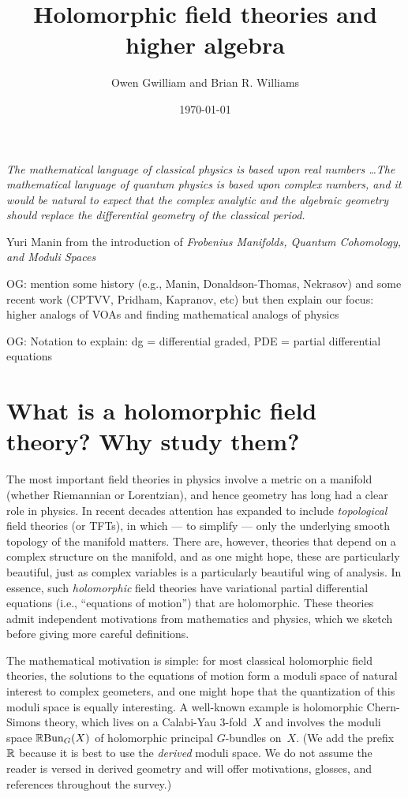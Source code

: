 \documentclass[11pt]{amsart}
\author{Owen Gwilliam and Brian R. Williams}
\date{\today}
\title{Holomorphic field theories and higher algebra}
\def\owen#1{{\textcolor{violet!50!black}{OG: {#1}}}}
\begin{document}

\maketitle

\epigraph{\itshape The mathematical language of classical physics is based upon real numbers \dots The mathematical language of quantum physics is based upon complex numbers, and it would be natural to expect that the complex analytic and the algebraic geometry should replace the differential geometry of the classical period.}{Yuri Manin from the introduction of {\it Frobenius Manifolds, Quantum Cohomology, and Moduli Spaces}}

\tableofcontents

\owen{mention some history (e.g., Manin, Donaldson-Thomas, Nekrasov) and some recent work (CPTVV, Pridham, Kapranov, etc) but then explain our focus: higher analogs of VOAs and finding mathematical analogs of physics}

\owen{Notation to explain: dg = differential graded, PDE = partial differential equations}

\section{What is a holomorphic field theory? Why study them?}

The most important field theories in physics involve a metric on a manifold (whether Riemannian or Lorentzian), and hence geometry has long had a clear role in physics.
In recent decades attention has expanded to include {\em topological} field theories (or TFTs), 
in which --- to simplify --- only the underlying smooth topology of the manifold matters.
There are, however, theories that depend on a complex structure on the manifold,
and as one might hope, these are particularly beautiful, 
just as complex variables is a particularly beautiful wing of analysis.
In essence, such {\em holomorphic} field theories have variational partial differential equations (i.e., ``equations of motion'') that are holomorphic.
These theories admit independent motivations from mathematics and physics,
which we sketch before giving more careful definitions.

The mathematical motivation is simple:
for most classical holomorphic field theories, the solutions to the equations of motion form a moduli space of natural interest to complex geometers,
and one might hope that the quantization of this moduli space is equally interesting.
A well-known example is holomorphic Chern-Simons theory,
which lives on a Calabi-Yau 3-fold~$X$ and involves the moduli space $\mathbb R{\rm Bun}_G(X)$ of holomorphic principal $G$-bundles on~$X$.
(We add the prefix $\mathbb R$ because it is best to use the {\em derived} moduli space.
We do not assume the reader is versed in derived geometry and will offer motivations, glosses, and references throughout the survey.)
\end{document}
